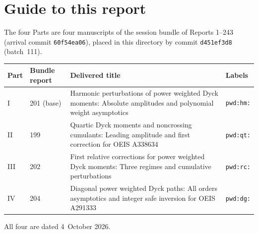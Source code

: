 \documentclass[11pt,letterpaper]{article}
\numberwithin{equation}{section}
\theoremstyle{remark}\newtheorem{remark}[theorem]{Remark}
\newcommand{\file}[1]{\nolinkurl{#1}}
\begin{document}
\section*{Guide to this report}\label{pwd:sec:guide}
The four Parts are four manuscripts of the session bundle of Reports 1--243
(arrival commit \file{60f54ea06}), placed in this directory by commit
\file{d451ef3d8} (batch~111).
\begin{center}
\small
\begin{tabular}{@{}l l >{\raggedright\arraybackslash}p{} l@{}}
\toprule
Part & Bundle report & Delivered title & Labels\\
\midrule
I & 201 (base) & Harmonic perturbations of power weighted Dyck moments: Absolute amplitudes and polynomial weight asymptotics & \file{pwd:hm:}\\
II & 199 & Quartic Dyck moments and noncrossing cumulants: Leading amplitude and first correction for OEIS A338634 & \file{pwd:qt:}\\
III & 202 & First relative corrections for power weighted Dyck moments: Three regimes and cumulative perturbations & \file{pwd:rc:}\\
IV & 204 & Diagonal power weighted Dyck paths: All orders asymptotics and integer safe inversion for OEIS A291333 & \file{pwd:dg:}\\
\bottomrule
\end{tabular}
\end{center}
All four are dated 4~October 2026.
\end{document}
